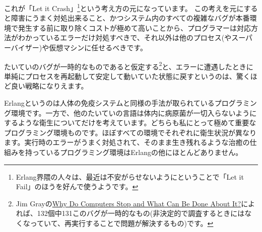これが「Let it Crash」\footnote{Erlang界隈の人々は、最近は不安がらせないようにということで「Let it Fail」のほうを好んで使うようです。}という考え方の元になっています。
この考えを元にすると障害にうまく対処出来ること、かつシステム内のすべての複雑なバグが本番環境で発生する前に取り除くコストが極めて高いことから、プログラマーは対応方法がわかっているエラーだけ対処すべきで、それ以外は他のプロセス(やスーパーバイザー)や仮想マシンに任せるべきです。

たいていのバグが一時的なものであると仮定する\footnote{Jim Grayの\href{http://www.hpl.hp.com/techreports/tandem/TR-85.7.html}{Why Do Computers Stop and What Can Be Done About It?}によれば、132個中131このバグが一時的なもの(非決定的で調査するときにはなくなっていて、再実行することで問題が解決するもの)です。}と、エラーに遭遇したときに単純にプロセスを再起動して安定して動いていた状態に戻すというのは、驚くほど良い戦略になりえます。

Erlangというのは人体の免疫システムと同様の手法が取られているプログラミング環境です。一方で、他のたいていの言語は体内に病原菌が一切入らないようにするような衛生についてだけを考えています。どちらも私にとって極めて重要なプログラミング環境ものです。ほぼすべての環境でそれぞれに衛生状況が異なります。実行時のエラーがうまく対処されて、そのまま生き残れるような治癒の仕組みを持っているプログラミング環境はErlangの他にほとんどありません。

